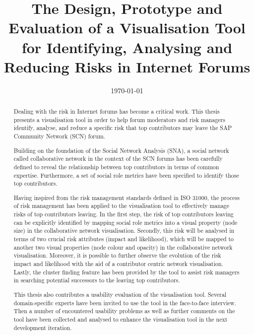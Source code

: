 \documentclass{ecsthesis}      %
\begin{document}
\frontmatter
\title      {The Design, Prototype and Evaluation of a Visualisation Tool for Identifying, Analysing and Reducing Risks in Internet Forums}
\addresses  {\groupname\\\deptname\\\univname}
\date       {\today}
\subject    {}
\keywords   {}
\maketitle
\begin{abstract}
Dealing with the risk in Internet forums has become a critical work. This thesis presents a visualisation tool in order to help forum moderators and risk managers identify, analyse, and reduce a specific risk that top contributors may leave the SAP Community Network (SCN) forum.

Building on the foundation of the Social Network Analysis (SNA), a social network called collaborative network in the context of the SCN forums has been carefully defined to reveal the relationship between top contributors in terms of common expertise. Furthermore, a set of social role metrics have been specified to identify those top contributors.

Having inspired from the risk management standards defined in ISO 31000, the process of risk management has been applied to the visualisation tool to effectively manage risks of top contributors leaving. In the first step, the risk of top contributors leaving can be explicitly identified by mapping social role metrics into a visual property (node size) in the collaborative network visualisation. Secondly, this risk will be analysed in terms of two crucial risk attributes (impact and likelihood), which will be mapped to another two visual properties (node colour and opacity) in the collaborative network visualisation. Moreover, it is possible to further observe the evolution of the risk impact and likelihood with the aid of a contributor centric network visualisation. Lastly, the cluster finding feature has been provided by the tool to assist risk managers in searching potential successors to the leaving top contributors.

This thesis also contributes a usability evaluation of the visualisation tool. Several domain-specific experts have been invited to use the tool in the face-to-face interview. Then a number of encountered usability problems as well as further comments on the tool have been collected and analysed to enhance the visualisation tool in the next development iteration.    
 
\end{abstract}
\end{document}
